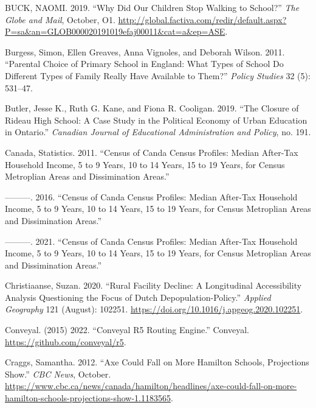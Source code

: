 \documentclass[
default
]{sn-jnl}
\newlength{\cslhangindent}
\newenvironment{CSLReferences}[2] %
 {\begin{list}{}{%
  \setlength{\itemindent}{0pt}
  \setlength{\leftmargin}{0pt}
  \setlength{\parsep}{0pt}
  \ifodd #1
   \setlength{\leftmargin}{\cslhangindent}
   \setlength{\itemindent}{-1\cslhangindent}
  \fi
  \setlength{\itemsep}{#2\baselineskip}}}
 {\end{list}}
\begin{document}
\begin{CSLReferences}{1}{0}
BUCK, NAOMI. 2019. {``Why Did Our Children Stop Walking to School?''}
\emph{The Globe and Mail}, October, O1.
\url{http://global.factiva.com/redir/default.aspx?P=sa&an=GLOB000020191019efaj00011&cat=a&ep=ASE}.

Burgess, Simon, Ellen Greaves, Anna Vignoles, and Deborah Wilson. 2011.
{``Parental Choice of Primary School in England: What Types of School Do
Different Types of Family Really Have Available to Them?''} \emph{Policy
Studies} 32 (5): 531--47.

Butler, Jesse K., Ruth G. Kane, and Fiona R. Cooligan. 2019. {``The
{Closure} of {Rideau High School}: {A Case Study} in the {Political
Economy} of {Urban Education} in {Ontario}.''} \emph{Canadian Journal of
Educational Administration and Policy}, no. 191.

Canada, Statistics. 2011. {``Census of Canda Census Profiles: Median
After-Tax Household Income, 5 to 9 Years, 10 to 14 Years, 15 to 19
Years, for Census Metroplian Areas and Dissimination Areas.''}

---------. 2016. {``Census of Canda Census Profiles: Median After-Tax
Household Income, 5 to 9 Years, 10 to 14 Years, 15 to 19 Years, for
Census Metroplian Areas and Dissimination Areas.''}

---------. 2021. {``Census of Canda Census Profiles: Median After-Tax
Household Income, 5 to 9 Years, 10 to 14 Years, 15 to 19 Years, for
Census Metroplian Areas and Dissimination Areas.''}

Christiaanse, Suzan. 2020. {``Rural Facility Decline: A Longitudinal
Accessibility Analysis Questioning the Focus of Dutch
Depopulation-Policy.''} \emph{Applied Geography} 121 (August): 102251.
\url{https://doi.org/10.1016/j.apgeog.2020.102251}.

Conveyal. (2015) 2022. {``Conveyal {R5 Routing Engine}.''} {Conveyal}.
\url{https://github.com/conveyal/r5}.

Craggs, Samantha. 2012. {``Axe Could Fall on More Hamilton Schools,
Projections Show.''} \emph{{CBC} News}, October.
\url{https://www.cbc.ca/news/canada/hamilton/headlines/axe-could-fall-on-more-hamilton-schools-projections-show-1.1183565}.


\end{CSLReferences}
\end{document}
